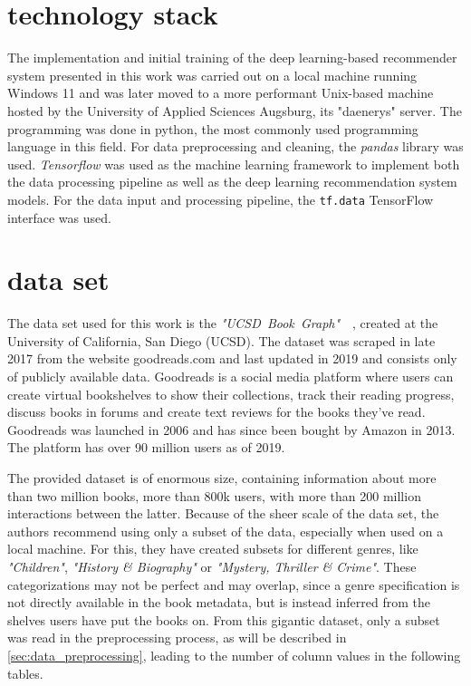 \documentclass[10pt,final,journal,a4paper,oneside,twocolumn]{IEEEtran}
\begin{document}
\section{technology stack}
The implementation and initial training of the deep learning-based recommender system presented in this work was carried out on a local machine running Windows 11 and was later moved to a more performant Unix-based machine hosted by the University of Applied Sciences Augsburg, its "daenerys" server.
The programming was done in python, the most commonly used programming language in this field. For data preprocessing and cleaning, the \emph{pandas} library was used.
\emph{Tensorflow} was used as the machine learning framework to implement both the data processing pipeline as well as the deep learning recommendation system models. For the data input and processing pipeline, the \texttt{tf.data} TensorFlow interface was used.


\section{data set}\label{sec:data}
The data set used for this work is the \emph{"UCSD~Book~Graph"}~\cite{Wan.2018}~\cite{Wan.2019}, created at the University of California, San Diego (UCSD).
The dataset was scraped in late 2017 from the website goodreads.com and last updated in 2019 and consists only of publicly available data. Goodreads is a social media platform where users can create virtual bookshelves to show their collections, track their reading progress, discuss books in forums and create text reviews for the books they've read. Goodreads was launched in 2006 and has since been bought by Amazon in 2013. The platform has over 90 million users as of 2019.

The provided dataset is of enormous size, containing information about more than two million books, more than 800k users, with more than 200 million interactions between the latter.
Because of the sheer scale of the data set, the authors recommend using only a subset of the data, especially when used on a local machine. For this, they have created subsets for different genres, like \emph{"Children"}, \emph{"History \& Biography"} or \emph{"Mystery, Thriller \& Crime"}. These categorizations may not be perfect and may overlap, since a genre specification is not directly available in the book metadata, but is instead inferred from the shelves users have put the books on.
From this gigantic dataset, only a subset was read in the preprocessing process, as will be described in \autoref{sec:data_preprocessing}, leading to the number of column values in the following tables.
\end{document}
